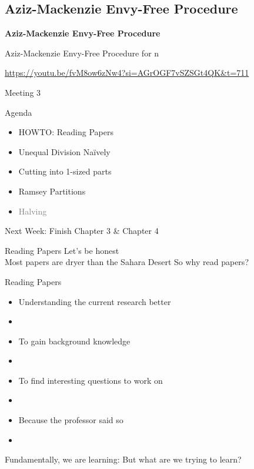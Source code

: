 \documentclass[aspectratio=169,xcolor=dvipsnames]{beamer}
\begin{document}
\subsection{Aziz-Mackenzie Envy-Free Procedure}
\begin{frame}
	\Huge{\centerline{\textbf{Aziz-Mackenzie Envy-Free Procedure}}}
\end{frame}
\begin{frame}{Aziz-Mackenzie Envy-Free Procedure for n}
	\centerline{\url{https://youtu.be/fvM8ow6zNw4?si=AGrOGF7vSZSGt4QK&t=711}}
\end{frame}
\begin{frame}{Meeting 3}
	\begin{block}{Agenda}
		\begin{itemize}
			\item HOWTO: Reading Papers
			\item Unequal Division Na{\"i}vely
			\item Cutting into 1-sized parts
			\item Ramsey Partitions
			\item \textcolor{Gray}{Halving}
		\end{itemize}
	\end{block}
	Next Week: Finish Chapter 3 \& Chapter 4
\end{frame}
\begin{frame}{Reading Papers}
	Let's be honest\\Most papers are dryer than the Sahara Desert\pause
	\newline
	\newline
	So why read papers?
\end{frame}
\begin{frame}{Reading Papers}
	\begin{itemize}
		\item Understanding the current research better \item
		\item To gain background knowledge \item
		\item To find interesting questions to work on \item
		\item Because the professor said so \item
	\end{itemize}
	Fundamentally, we are learning: But what are we trying to learn?
\end{frame}
\end{document}
